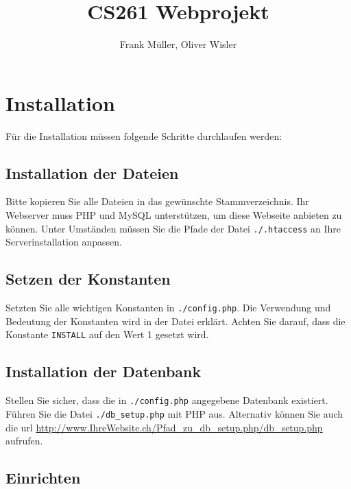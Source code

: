 \documentclass[ngerman, 12pt, pdftex]{scrartcl}[2006/07/30]
\title{CS261 Webprojekt}
\author{Frank Müller, Oliver Wisler}
\begin{document}
\pagestyle{fancy}
\fancyhf{} 
\renewcommand{\headrulewidth}{0.1pt} 	%
\fancyfoot[C]{\thepage} 				%




\tableofcontents
\newpage


\section{Installation}

Für die Installation müssen folgende Schritte durchlaufen werden:
\subsection{Installation der Dateien}
    Bitte kopieren Sie alle Dateien in das gewünschte Stammverzeichnis.
    Ihr Webserver muss PHP und MySQL unterstützen, um diese Webseite anbieten zu können. Unter Umständen müssen Sie die Pfade der Datei \verb+./.htaccess+ an Ihre Serverinstallation anpassen.
\subsection{Setzen der Konstanten}
    Setzten Sie alle wichtigen Konstanten in \verb+./config.php+.
    Die Verwendung und Bedeutung der Konstanten wird in der Datei erklärt.
    Achten Sie darauf, dass die Konstante \verb+INSTALL+ auf den Wert 1 gesetzt wird.
\subsection{Installation der Datenbank} %
\label{sub:Installation der Datenbank}
    Stellen Sie sicher, dass die in  \verb+./config.php+ angegebene Datenbank existiert.
    Führen Sie die Datei  \verb+./db_setup.php+ mit PHP aus. Alternativ können Sie auch 
    die url  \url{http://www.IhreWebsite.ch/Pfad_zu_db_setup.php/db_setup.php} aufrufen.
\subsection{Einrichten} %
\label{sub:Einrichten}
\end{document}
